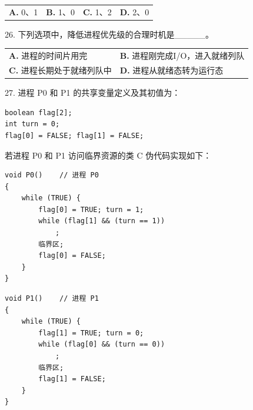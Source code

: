 \documentclass[UTF8,11pt]{ctexart}
\begin{document}
\begin{center}\begin{tabular}{>{\raggedright\arraybackslash}p{\dimexpr(\linewidth-8\tabcolsep)/4\relax}>{\raggedright\arraybackslash}p{\dimexpr(\linewidth-8\tabcolsep)/4\relax}>{\raggedright\arraybackslash}p{\dimexpr(\linewidth-8\tabcolsep)/4\relax}>{\raggedright\arraybackslash}p{\dimexpr(\linewidth-8\tabcolsep)/4\relax}}
\textbf{A.} 0、1 & \textbf{B.} 1、0 & \textbf{C.} 1、2 & \textbf{D.} 2、0\\[.35em]\end{tabular}\end{center}

26. 下列选项中，降低进程优先级的合理时机是\_\_\_\_\_。


\begin{center}\begin{tabular}{>{\raggedright\arraybackslash}p{\dimexpr(\linewidth-4\tabcolsep)/2\relax}>{\raggedright\arraybackslash}p{\dimexpr(\linewidth-4\tabcolsep)/2\relax}}
\textbf{A.} 进程的时间片用完 & \textbf{B.} 进程刚完成I/O，进入就绪列队\\[.35em]
\textbf{C.} 进程长期处于就绪列队中 & \textbf{D.} 进程从就绪态转为运行态\\[.35em]\end{tabular}\end{center}

27. 进程 P0 和 P1 的共享变量定义及其初值为：


\begin{Verbatim}[breaklines,breakanywhere,fontsize=\small]
boolean flag[2];
int turn = 0;
flag[0] = FALSE; flag[1] = FALSE;
\end{Verbatim}

若进程 P0 和 P1 访问临界资源的类 C 伪代码实现如下：


\begin{Verbatim}[breaklines,breakanywhere,fontsize=\small]
void P0()    // 进程 P0
{
    while (TRUE) {
        flag[0] = TRUE; turn = 1;
        while (flag[1] && (turn == 1))
            ;
        临界区;
        flag[0] = FALSE;
    }
}
\end{Verbatim}

\begin{Verbatim}[breaklines,breakanywhere,fontsize=\small]
void P1()    // 进程 P1
{
    while (TRUE) {
        flag[1] = TRUE; turn = 0;
        while (flag[0] && (turn == 0))
            ;
        临界区;
        flag[1] = FALSE;
    }
}
\end{Verbatim}
\end{document}
